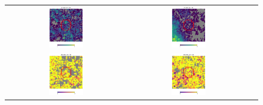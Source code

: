 \documentclass[preprintm,linenumbers]{aastex631}
\begin{document}
\begin{figure}
\begin{tabular}{  c c c}
				\includegraphics[width=0.3\textwidth]{results/skymaps_cutout/skymaps_cutout_first_year_one_snap_v4_0_10yrs_db_noDD_noTwi_tscale-3_nside-256_doAllTemplateMetrics_reduceCount_g_WFD_noDD_noTwi.pdf} &
				\includegraphics[width=0.3\textwidth]{results/skymaps_cutout/skymaps_cutout_first_year_one_snap_v4_0_10yrs_db_noDD_noTwi_tscale-3_nside-256_doAllTemplateMetrics_reduceCount_g_GP_noDD_noTwi.pdf} \\
				\includegraphics[width=0.3\textwidth]{results/skymaps_cutout/skymaps_cutout_delta_first_year_one_snap_v4_0_10yrs_db_noDD_noTwi_tscale-3_nside-256_doAllTemplateMetrics_reduceCount_g_NES_noDD_noTwi.pdf} &
				\includegraphics[width=0.3\textwidth]{results/skymaps_cutout/skymaps_cutout_delta_first_year_one_snap_v4_0_10yrs_db_noDD_noTwi_tscale-3_nside-256_doAllTemplateMetrics_reduceCount_g_WFD_noDD_noTwi.pdf} &

\end{tabular}
\end{figure}
\end{document}
